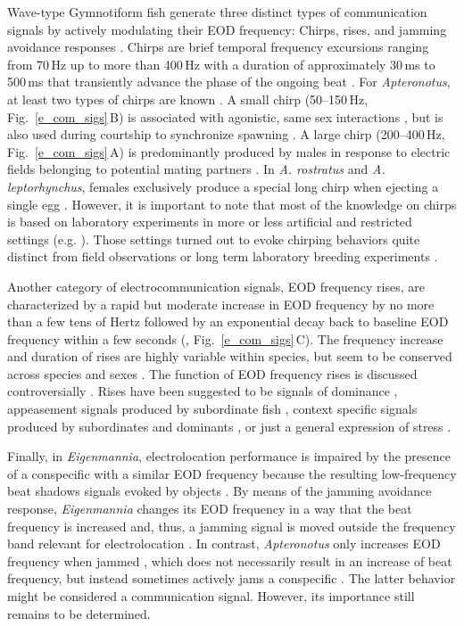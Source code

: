 \documentclass[11pt,pdftex]{article}
\newcommand{\panel}[1]{\textsf{#1}}
\newcommand{\subfref}[2]{\textup{\ref{#1}}\,\panel{#2}}
\newcommand{\figb}{Fig.}
\newcommand{\subfigrefb}[2]{\figb~\subfref{#1}{#2}}
\newcommand{\aptero}{\textit{Apteronotus}}
\newcommand{\lepto}{\textit{A. leptorhynchus}}
\newcommand{\rostratus}{\textit{A. rostratus}}
\newcommand{\Eigenmannia}{\textit{Eigenmannia}}
\begin{document}
Wave-type Gymnotiform fish generate three distinct types of communication signals by actively modulating their EOD frequency: Chirps, rises, and jamming avoidance responses \citep{Engler2000, Zakon2002}. Chirps are brief temporal frequency excursions ranging from 70\,Hz up to more than 400\,Hz with a duration of approximately 30\,ms to 500\,ms \citep{Engler2000} that transiently advance the phase of the ongoing beat \citep{Benda2005}. For \aptero{}, at least two types of chirps are known \citep{Hagedorn1985, Dunlap2003b, Henninger2018}. A small chirp (50--150\,Hz, \subfigrefb{e_com_sigs}{B}) is associated with agonistic, same sex interactions \citep{Smith2013}, but is also used during courtship to synchronize spawning \citep{Henninger2018}. A large chirp (200--400\,Hz, \subfigrefb{e_com_sigs}{A}) is predominantly produced by males in response to electric fields belonging to potential mating partners \citep{Triefenbach2003}. In \rostratus{} and \lepto{}, females exclusively produce a special long chirp when ejecting a single egg \citep{Hagedorn1985, Henninger2018}. However, it is important to note that most of the knowledge on chirps is based on laboratory experiments in more or less artificial and restricted settings (e.g. \citealp{Engler2001, Dunlap2003b, Zupanc2006, Hupe2008}). Those settings turned out to evoke chirping behaviors quite distinct from field observations or long term laboratory breeding experiments \citep{Henninger2018}. 

Another category of electrocommunication signals, EOD frequency rises, are characterized by a rapid but moderate increase in EOD frequency by no more than a few tens of Hertz followed by an exponential decay back to baseline EOD frequency within a few seconds (\citealp{Hagedorn1985, Engler2000, Zakon2002}, \subfigrefb{e_com_sigs}{C}). The frequency increase and duration of rises are highly variable within species, but seem to be conserved across species and sexes \citep{Turner2007}. The function of EOD frequency rises is discussed controversially \citep{Smith2013}. Rises have been suggested to be signals of dominance \citep{Tallarovic2005}, appeasement signals produced by subordinate fish \citep{Serrano2003}, context specific signals produced by subordinates and dominants \citep{Hopkins1974}, or just a general expression of stress \citep{Smith2013}.

Finally, in \Eigenmannia{}, electrolocation performance is impaired by the presence of a conspecific with a similar EOD frequency \citep{Heiligenberg1973} because the resulting low-frequency beat shadows signals evoked by objects \citep{Behrend1977}. By means of the jamming avoidance response, \Eigenmannia{} changes its EOD frequency in a way that the beat frequency is increased \citep{Watanabe1963, Bullock1969} and, thus, a jamming signal is moved outside the frequency band relevant for electrolocation \citep{Nelson1999, Fotowat2013}. In contrast, \aptero{} only increases EOD frequency when jammed \citep{Heiligenberg1996}, which does not necessarily result in an increase of beat frequency, but instead sometimes actively jams a conspecific \citep{Tallarovic2005, Triefenbach2008}. The latter behavior might be considered a communication signal. However, its importance still remains to be determined.
\end{document}
